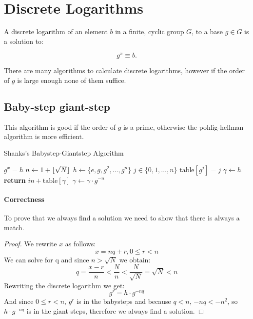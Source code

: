 

\chapter{Discrete Logarithms}

A discrete logarithm of an element $b$ in a finite, cyclic group $G$, to a base $g \in G$ is a solution to:

\[ g^x \equiv b. \]

There are many algorithms to calculate discrete logarithms, however if the order of $g$ is large enough none of them suffice.

\section{Baby-step giant-step}

This algorithm is good if the order of $g$ is a prime, otherwise the pohlig-hellman algorithm is more efficient.

\begin{algorithm}[H]
  \caption{Shanks's Babystep-Giantstep Algorithm}
  \begin{algorithmic}
   \Require $g^x = h$
   \State $n \gets 1 + \lfloor\sqrt{N}\rfloor$ 
   \State $h \gets \{e, g, g^2, \dots, g^n\}$
   \For $j \in \{0,1,\dots,n\}$
     \State $\text{table}[g^j] = j$
   \EndFor
   \State $\gamma \gets h$
       \State \textbf{return} $in + \text{table}[\gamma]$
     \Else
       \State $\gamma \gets \gamma \cdot g^{-n}$
     \EndIf
   \EndFor
     
  \end{algorithmic}
\end{algorithm}

\subsubsection{Correctness}

To prove that we always find a solution we need to show that there is always a match.

\begin{proof}
  We rewrite $x$ as follows:
  \[ x = nq + r, 0 \leq r < n \]
  We can solve for q and since $n > \sqrt{N}$ we obtain:
  \[ q = \frac{x-r}{n} < \frac{N}{n} < \frac{N}{\sqrt{N}} = \sqrt{N} < n \]
  Rewriting the discrete logarithm we get:
  \[ g^r = h\cdot g^{-nq} \]
  And since $0 \leq r < n$, $g^r$ is in the babysteps and because $q < n$, $-nq < -n^2$, so $h\cdot g^{-nq}$ is in the giant steps, therefore we always find a solution.
  
\end{proof}

